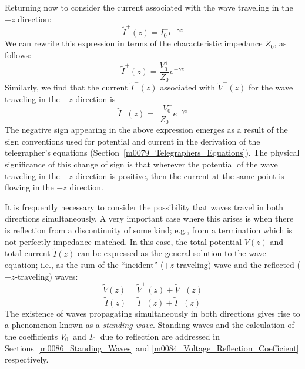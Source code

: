 Returning now to consider the current associated with the wave traveling in the $+z$ direction:
%
\begin{equation}
\widetilde{I}^+(z) = I_0^+ e^{-\gamma z} 
\end{equation}
%
We can rewrite this expression in terms of the characteristic impedance 
$Z_0$, as follows:
%
\begin{equation}
\widetilde{I}^+(z) = \frac{V_0^+}{Z_0} e^{-\gamma z}
\end{equation}
%
Similarly, we find that the current $\widetilde{I}^-(z)$ associated with $\widetilde{V}^-(z)$ for the wave traveling in the $-z$ direction is
%
\begin{equation}
\widetilde{I}^-(z) = \frac{-V_0^-}{Z_0} e^{-\gamma z}
\end{equation}
%
The negative sign appearing in the above expression emerges as a result of the sign conventions used for potential and current in the derivation of the telegrapher's equations (Section~\ref{m0079_Telegraphers_Equations}).
The physical significance of this change of sign is that wherever the potential of the wave traveling in the $-z$ direction is positive, then the current at the same point is flowing in the $-z$ direction. 

It is frequently necessary to consider the possibility that waves travel in both directions simultaneously. 
A very important case where this arises is when there is reflection from a discontinuity of some kind; e.g., from a termination which is not perfectly impedance-matched.
In this case, the total potential $\widetilde{V}(z)$ and total current $\widetilde{I}(z)$ can be expressed as the general solution to the wave equation; i.e., as the sum of the ``incident'' ($+z$-traveling) wave and the reflected ($-z$-traveling) waves:
%
\begin{equation}
\widetilde{V}(z) = \widetilde{V}^+(z) + \widetilde{V}^-(z)
\end{equation}
%
\begin{equation}
\widetilde{I}(z) = \widetilde{I}^+(z) + \widetilde{I}^-(z)
\end{equation}
%
The existence of waves propagating simultaneously in both directions gives rise to a phenomenon known as a \emph{standing wave}. 
Standing waves and the calculation of the coefficients $V_0^{-}$ and $I_0^{-}$ due to reflection are addressed in Sections~\ref{m0086_Standing_Waves} and \ref{m0084_Voltage_Reflection_Coefficient} respectively.

